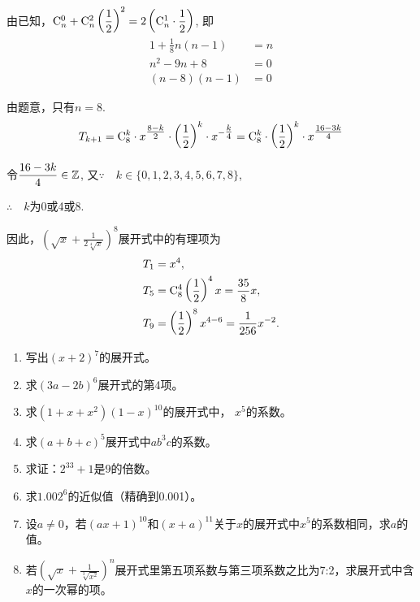 \begin{solution}
    由已知，$\comb{n}{0}+\comb{n}{2}\left(\frac{1}{2}\right)^{2}=2\left(\comb{n}{1}\cdot \frac{1}{2}\right)$,
即
\[\begin{split}
    1+\frac{1}{8}n(n-1)&=n\\
n^{2}-9n+8&=0\\
(n-8)(n-1)&=0
\end{split} \]

由题意，只有$ n=8$.
\[T_{k+1}=\comb{8}{k}\cdot  x^{\tfrac{8-k}{2}}\cdot \left(\frac{1}{2}\right)^{k}\cdot  x^{-\tfrac{k}{4}}=\comb{8}{k}\cdot \left(\frac{1}{2}\right)^{k}\cdot  x^{\tfrac{16-3k}{4}}\]

令$\frac{16-3k}{4}\in \Z$, \qquad 又$\because\quad k\in\{0,1,2,3,4,5,6,7,8\}$,

$\therefore \quad k$为0或4或8.

因此，$\left(\sqrt{x}+\frac{1}{2\sqrt[4]{x}}\right)^{8}$展开式中的有理项为
\[\begin{split}
    T_{1}&=x^{4},\\
T_{5}&=\comb{8}{4}\left(\frac{1}{2}\right)^{4}x=\frac{35}{8}x,\\
T_{9}&=\left(\frac{1}{2}\right)^{8}x^{4-6}=\frac{1}{256}x^{-2}.
\end{split}\]
\end{solution}

\begin{ex}
\begin{enumerate}
    \item 写出$ (x+2)^{7} $的展开式。
    \item 求$ (3a-2b)^{6} $展开式的第4项。
    \item 求$ \left(1+x+x^{2}\right)(1-x)^{10} $的展开式中， $x^{5} $的系数。
    \item 求$ (a+b+c)^{5} $展开式中$ ab^{3}c $的系数。
    \item 求证：$ 2^{33}+1 $是$9$的倍数。
    \item 求$ 1.002^{6} $的近似值（精确到0.001）。
    \item 设$a\ne 0$，若$ (ax+1)^{10} $和$ (x+a)^{11} $关于$x$的展开式中$ x^{5} $的系数相同，求$a$的值。
    \item 若$ \left(\sqrt{x}+\frac{1}{\sqrt[3]{x^{2}}}\right)^{n}$展开式里第五项系数与第三项系数之比为7:2，求展开式中含$x$的一次幂的项。
\end{enumerate}
\end{ex}






